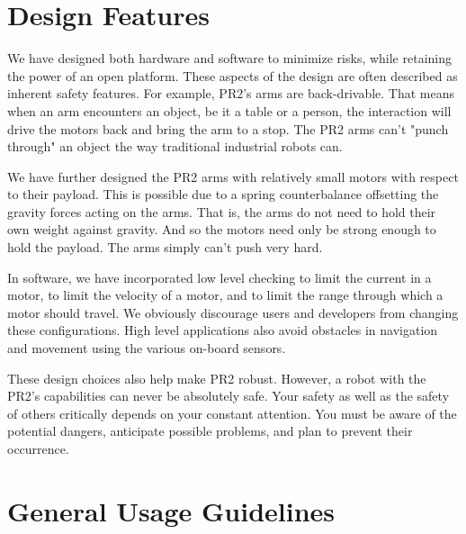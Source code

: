 \section{Design Features}

We have designed both hardware and software to minimize risks, while retaining the power of an open platform.  These aspects of the design are often described as inherent safety features.  For example, PR2's arms are back-drivable.  That means when an arm encounters an object, be it a table or a person, the interaction will drive the motors back and bring the arm to a stop.  The PR2 arms can't "punch through" an object the way traditional industrial robots can.

We have further designed the PR2 arms with relatively small motors with respect to their payload.  This is possible due to a spring counterbalance offsetting the gravity forces acting on the arms.  That is, the arms do not need to hold their own weight against gravity.  And so the motors need only be strong enough to hold the payload.  The arms simply can't push very hard.

In software, we have incorporated low level checking to limit the current in a motor, to limit the velocity of a motor, and to limit the range through which a motor should travel.  We obviously discourage users and developers from changing these configurations.  High level applications also avoid obstacles in navigation and movement using the various on-board sensors.  

These design choices also help make PR2 robust.  However, a robot with the PR2’s capabilities can never be absolutely safe. Your safety as well as the safety of others critically depends on your constant attention. You must be aware of the potential dangers, anticipate possible problems, and plan to prevent their occurrence.

\section{General Usage Guidelines}

